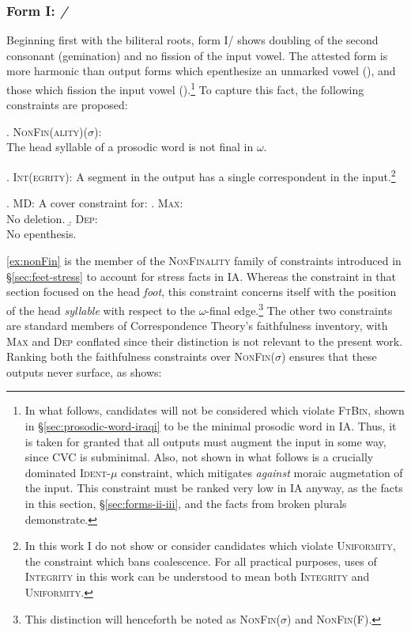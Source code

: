 \documentclass[12pt,twoside,letterpaper]{article}
\begin{document}
\subsubsection{Form I: {\em {}/}}
\label{sec:form-i}

Beginning first with the biliteral roots, form I/{\em {}} shows doubling of the second consonant (gemination) and no fission of the input vowel. The attested form is more harmonic than output forms which epenthesize an unmarked vowel ({\em {}}), and those which fission the input vowel ({\em {}}).\footnote{In what follows, candidates will not be considered which violate \textsc{FtBin}, shown in \S{\ref{sec:prosodic-word-iraqi}} to be the minimal prosodic word in IA. Thus, it is taken for granted that all outputs must augment the input in some way, since CVC is subminimal. Also, not shown in what follows is a crucially dominated \textsc{Ident-$\mu$} constraint, which mitigates \emph{against} moraic augmetation of the input. This constraint must be ranked very low in IA anyway, as the facts in this section, \S{\ref{sec:forms-ii-iii}}, and the facts from broken plurals \citep{mccarthy97} demonstrate.} To capture this fact, the following constraints are proposed:

\ex. \label{ex:nonFin}\textsc{NonFin(ality)}($\sigma$):\\The head syllable of a prosodic word is not final in $\omega$.

\ex. \label{ex:integrity}\textsc{Int(egrity)}: A segment in the output has a single correspondent in the input.\footnote{In this work I do not show or consider candidates which violate \textsc{Uniformity}, the constraint which bans coalescence. For all practical purposes, uses of \textsc{Integrity} in this work can be understood to mean both \textsc{Integrity} and \textsc{Uniformity}.}

\ex. \label{ex:max/dep}\textsc{MD}: A cover constraint for:
\a. \label{ex:max}\textsc{Max}:\\No deletion.
\b. \label{ex:dep}\textsc{Dep}:\\No epenthesis.

\ref{ex:nonFin} is the member of the \textsc{NonFinality} family of constraints introduced in \S{\ref{sec:feet-stress}} to account for stress facts in IA. Whereas the constraint in that section focused on the head \emph{foot}, this constraint concerns itself with the position of the head \emph{syllable} with respect to the $\omega$-final edge.\footnote{This distinction will henceforth be noted as \textsc{NonFin}($\sigma$) and \textsc{NonFin}(F).}  The other two constraints are standard members of Correspondence Theory's faithfulness inventory, with \textsc{Max} and \textsc{Dep} conflated since their distinction is not relevant to the present work. Ranking both the faithfulness constraints over \textsc{NonFin}($\sigma$) ensures that these outputs never surface, as \Next shows:
\end{document}
